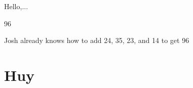 \documentclass{article}
\begin{document}


Hello,...

\begin{Schunk}
\begin{Soutput}
[1] 96
\end{Soutput}
\end{Schunk}

Josh already knows how to add 24, 35, 23, and 14 to get 96

\section{Huy}
\end{document}

